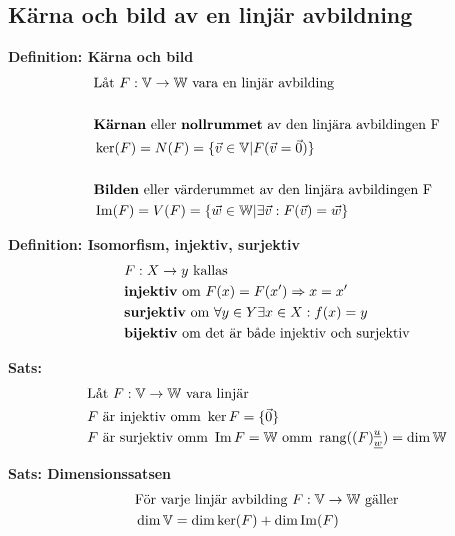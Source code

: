\begin{multicols}{2}


\section{Kärna och bild av en linjär avbildning}

\textbf{Definition: Kärna och bild}
\begin{align*}
  &\quad  \text{Låt $F:\mathbb{V}\to\mathbb{W}$ vara en linjär avbilding} \\
  &\quad  \\
  &\quad  \text{\textbf{Kärnan} eller \textbf{nollrummet} av den linjära avbildingen F} \\
  &\quad  \ker(F) = N(F) = \{\vec{v}\in\mathbb{V} | F(\vec{v} = \vec{0})\} \\
  &\quad  \\
  &\quad  \text{\textbf{Bilden} eller \text{värderummet} av den linjära avbildingen F} \\
  &\quad  \operatorname{Im}(F) = V(F) = \{\vec{w}\in\mathbb{W} | \exists\vec{v}:F(\vec{v})=\vec{w}\} \\
\end{align*}

\textbf{Definition: Isomorfism, injektiv, surjektiv }
\begin{align*}
  &\quad  F:X\to{y} \text{ kallas} \\
  &\quad  \text{\textbf{injektiv} om } F(x) = F(x') \Rightarrow x = x' \\
  &\quad  \text{\textbf{surjektiv} om } \forall{y}\in Y\exists{x}\in{X}:f(x)=y \\
  &\quad  \text{\textbf{bijektiv} om det är både injektiv och surjektiv} 
\end{align*}

\textbf{Sats:}
\begin{align*}
  &\quad  \text{Låt $F:\mathbb{V}\to\mathbb{W}$ vara linjär} \\
  &\quad  F \text{ är injektiv omm } \ker{F} = \{\vec{0}\} \\
  &\quad  F \text{ är surjektiv omm } \operatorname{Im}{F} = \mathbb{W} \text{ omm }
  \operatorname{rang} ({(F)}^{\underline{u}}_{\underline{w}}) = \dim{\mathbb{W}} \\
\end{align*}


\textbf{Sats: Dimensionssatsen}
\begin{align*}
  &\quad  \text{För varje linjär avbilding $F:\mathbb{V}\to\mathbb{W}$ gäller} \\
  &\quad  \dim{\mathbb{V}} = \dim{\ker(F)} + \dim{\operatorname{Im}(F)}  \\
\end{align*}


\end{multicols}
